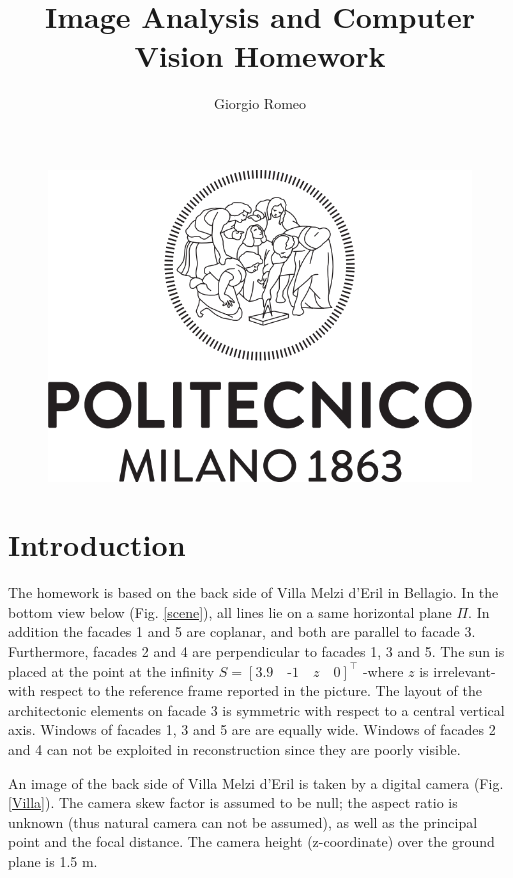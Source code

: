 \documentclass[11pt, oneside]{article}
\title{Image Analysis and Computer Vision Homework}
\author{Giorgio Romeo}
\affil{Politecnico di Milano \\ A.Y. 2021/2022}
\begin{document}
\maketitle

\begin{figure}[!b]
	\centering
	\includegraphics[width=0.7\linewidth]{Logo_Politecnico_Milano.png}
	\label{logo}
\end{figure}

\pagebreak
\tableofcontents
\pagebreak

\section{Introduction}
The homework is based on the back side of Villa Melzi d’Eril in Bellagio. In the bottom view below (Fig. \ref{scene}), all lines lie on a same horizontal plane $\Pi$. In addition the facades 1 and 5 are coplanar, and both are parallel to facade 3. Furthermore, facades 2 and 4 are perpendicular to facades 1, 3 and 5. The sun is placed at the point at the infinity
$ S = [3.9\quad \text{-} 1\quad z\quad 0]^\intercal $
-where $z$ is irrelevant- with respect to the reference frame reported in the picture. The layout of the architectonic elements on facade 3 is symmetric with respect to a central vertical axis. Windows of facades 1, 3 and 5 are are equally wide. Windows of facades 2 and 4 can not be exploited in reconstruction since they are poorly visible.

An image of the back side of Villa Melzi d’Eril is taken by a digital camera (Fig. \ref{Villa}). The camera skew factor is assumed to be null; the aspect ratio is unknown (thus natural camera can not be assumed), as well as the principal point and the focal distance. The camera height (z-coordinate) over the ground plane is 1.5 m.\\
\end{document}
